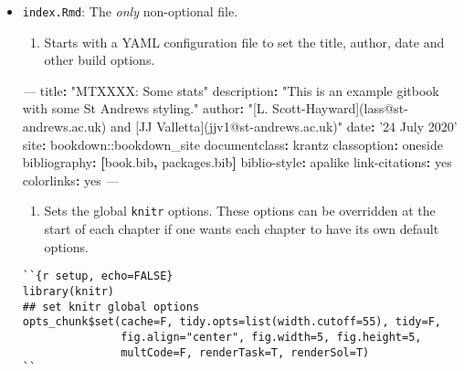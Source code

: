 \documentclass[
  oneside]{krantz}
\newenvironment{Shaded}{\begin{snugshade}}{\end{snugshade}}
\newcommand{\AttributeTok}[1]{\textcolor[rgb]{0.77,0.63,0.00}{#1}}
\newcommand{\CharTok}[1]{\textcolor[rgb]{0.31,0.60,0.02}{#1}}
\newcommand{\FunctionTok}[1]{\textcolor[rgb]{0.00,0.00,0.00}{#1}}
\newcommand{\KeywordTok}[1]{\textcolor[rgb]{0.13,0.29,0.53}{\textbf{#1}}}
\newcommand{\PreprocessorTok}[1]{\textcolor[rgb]{0.56,0.35,0.01}{\textit{#1}}}
\newcommand{\StringTok}[1]{\textcolor[rgb]{0.31,0.60,0.02}{#1}}
\providecommand{\tightlist}{%
  \setlength{\itemsep}{0pt}\setlength{\parskip}{0pt}}
\theoremstyle{definition}
\theoremstyle{definition}
\theoremstyle{definition}
\theoremstyle{remark}
\begin{document}
\begin{itemize}
\item
  \texttt{index.Rmd}: The \emph{only} non-optional file.

  \begin{enumerate}
  \def\labelenumi{\arabic{enumi}.}
  \tightlist
  \item
    Starts with a YAML configuration file to set the title, author, date and other build options.
  \end{enumerate}

\begin{Shaded}
\begin{Highlighting}[]
\PreprocessorTok{--- }
\FunctionTok{title}\KeywordTok{:}\AttributeTok{ }\StringTok{"MTXXXX: Some stats"}
\FunctionTok{description}\KeywordTok{:}\AttributeTok{ }\StringTok{"This is an example gitbook with some St Andrews styling."}
\FunctionTok{author}\KeywordTok{:}\AttributeTok{ }\StringTok{"[L. Scott-Hayward](lass@st-andrews.ac.uk) and [JJ Valletta](jjv1@st-andrews.ac.uk)"}
\FunctionTok{date}\KeywordTok{:}\AttributeTok{ }\StringTok{'24 July 2020'}
\FunctionTok{site}\KeywordTok{:}\AttributeTok{ bookdown::bookdown_site}
\FunctionTok{documentclass}\KeywordTok{:}\AttributeTok{ krantz}
\FunctionTok{classoption}\KeywordTok{:}\AttributeTok{ oneside}
\FunctionTok{bibliography}\KeywordTok{:}\AttributeTok{ }\KeywordTok{[}\AttributeTok{book.bib}\KeywordTok{,}\AttributeTok{ packages.bib}\KeywordTok{]}
\FunctionTok{biblio-style}\KeywordTok{:}\AttributeTok{ apalike}
\FunctionTok{link-citations}\KeywordTok{:}\AttributeTok{ }\CharTok{yes}
\FunctionTok{colorlinks}\KeywordTok{:}\AttributeTok{ }\CharTok{yes}
\PreprocessorTok{---}
\end{Highlighting}
\end{Shaded}

  \begin{enumerate}
  \def\labelenumi{\arabic{enumi}.}
  \setcounter{enumi}{1}
  \tightlist
  \item
    Sets the global \texttt{knitr} options. These options can be overridden at the start of each chapter if one wants each chapter to have its own default options.
  \end{enumerate}

\begin{verbatim}
``{r setup, echo=FALSE}
library(knitr)
## set knitr global options
opts_chunk$set(cache=F, tidy.opts=list(width.cutoff=55), tidy=F, 
               fig.align="center", fig.width=5, fig.height=5,
               multCode=F, renderTask=T, renderSol=T)
``
\end{verbatim}


\end{itemize}
\end{document}
